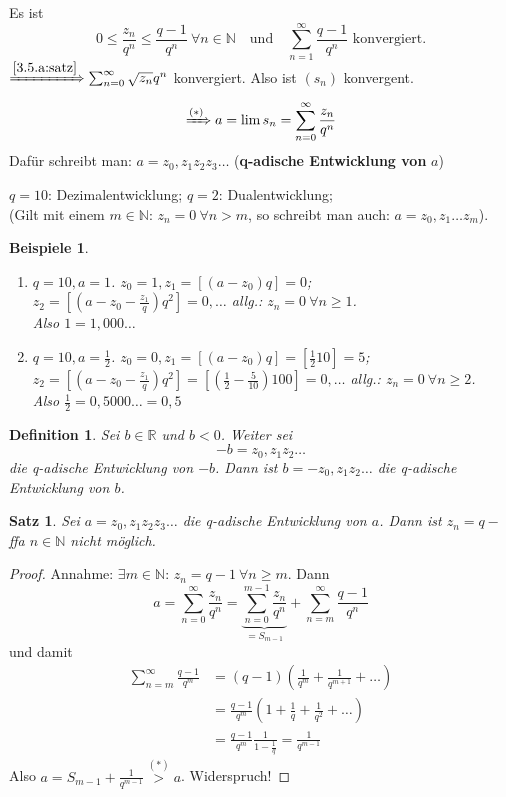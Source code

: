 \documentclass{extreport}
\newcommand{\N}{\mathbb{N}}
\newcommand{\R}{\mathbb{R}}
\theoremstyle{named}
\theoremstyle{dotless}
\newtheorem{satz}[namedtheorem]{Satz}
\newtheorem*{beispiele}{Beispiele}
\newtheorem*{definition}{Definition}
\begin{document}
Es ist
	$$ 0 \leq \frac{z_{n}}{q^{n}} \leq \frac{q - 1}{q^n} ~\forall n \in \N \quad \text{und} \quad \sum_{n=1}^{\infty} \frac{q - 1}{q^{n}} \text{ konvergiert}. $$
$\xRightarrow[]{\ref{3.5.a:satz}} \sum_{n=0}^{\infty}\sqrt{z_{n}}{q^{n}}$ konvergiert. Also ist $(s_{n})$ konvergent.
	$$ \xRightarrow[]{(*)} a = \lim s_{n} = \sum_{n=0}^{\infty} \frac{z_{n}}{q^{n}} $$
Dafür schreibt man: $a = z_{0}, z_{1} z_{2} z_{3} \dotsc$ (\textbf{q-adische Entwicklung von }$a$)

$q = 10$: Dezimalentwicklung; $q = 2$: Dualentwicklung; \\
(Gilt mit einem $m \in \N$: $z_{n} = 0 ~\forall n > m$, so schreibt man auch: $a = z_{0}, z_{1} \dotsc z_{m}$).


\begin{beispiele} ~\
	\begin{enumerate}
		\item $q = 10, a = 1$. $z_{0} = 1, z_{1} = [(a - z_{0})q] = 0$; \\
			$z_{2} = [(a - z_{0} - \frac{z_{1}}{q})q^{2}] = 0, \dotsc$ allg.: $z_{n} = 0 ~\forall n \geq 1$. \\
			Also $1 = 1,000\dotsc$
		\item $q = 10, a = \frac{1}{2}$. $z_{0} = 0, z_{1} = [(a - z_{0})q] = [\frac{1}{2} 10] = 5$; \\
			$z_{2} = [(a - z_{0} - \frac{z_{1}}{q})q^{2}] = [(\frac{1}{2} - \frac{5}{10}) 100] = 0, \dotsc$ allg.: $z_{n} = 0 ~\forall n \geq 2$. \\
			Also $\frac{1}{2} = 0,5000\dotsc = 0,5$
	\end{enumerate}
\end{beispiele}


\begin{definition}
	Sei $b \in \R$ und $b < 0$. Weiter sei
		$$ -b = z_{0}, z_{1} z_{2} \dotsc $$
	die q-adische Entwicklung von $-b$. Dann ist $b = - z_{0}, z_{1} z_{2} \dotsc$ die q-adische Entwicklung von $b$.
\end{definition}


\begin{satz} \label{5.2:satz}
	Sei $a = z_{0}, z_{1} z_{2} z_{3} \dotsc$ die q-adische Entwicklung von $a$. Dann ist $z_{n} = q -$ ffa $n \in \N$ nicht möglich.
\end{satz}

\begin{proof}
	Annahme: $\exists m \in \N$: $z_{n} = q - 1 ~\forall n \geq m$. Dann 
		$$ a = \sum_{n=0}^{\infty} \frac{z_{n}}{q^{n}} = \underbrace{\sum_{n=0}^{m-1} \frac{z_{n}}{q^{n}}}_{= S_{m-1}} + \sum_{n=m}^{\infty} \frac{q-1}{q^{n}} $$
	und damit
	\begin{align*}
		\sum_{n=m}^{\infty} \frac{q-1}{q^{m}} & = (q-1) \left( \frac{1}{q^{m}} + \frac{1}{q^{m+1}} + \dotsc \right) \\
			& = \frac{q - 1}{q^{m}} (1 + \frac{1}{q} + \frac{1}{q^{2}} + \dotsc) \\
			& = \frac{q - 1}{q^{m}} \frac{1}{1 - \frac{1}{q}} = \frac{1}{q^{m-1}}
	\end{align*} 
	Also $a = S_{m-1} + \frac{1}{q^{m-1}} \overset{(*)}{>} a$. Widerspruch!
\end{proof}
\end{document}
